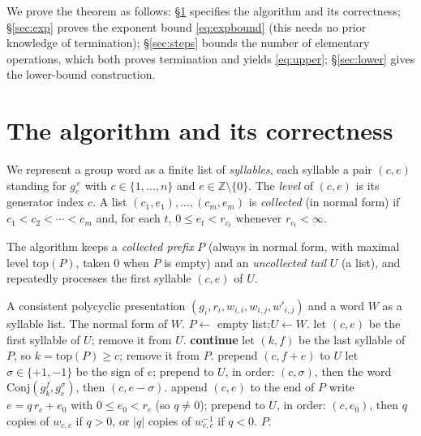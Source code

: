 \documentclass{amsart}
\theoremstyle{definition}
\begin{document}
\medskip
We prove the theorem as follows: \S\ref{sec:alg} specifies the algorithm and its correctness;
\S\ref{sec:exp} proves the exponent bound \eqref{eq:expbound} (this needs no prior knowledge
of termination); \S\ref{sec:steps} bounds the number of elementary operations, which both
proves termination and yields \eqref{eq:upper}; \S\ref{sec:lower} gives the lower-bound
construction.

\section{The algorithm and its correctness}\label{sec:alg}

We represent a group word as a finite list of \emph{syllables}, each syllable a pair $(c,e)$
standing for $g_c^{\,e}$ with $c\in\{1,\dots,n\}$ and $e\in\mathbb Z\setminus\{0\}$. The
\emph{level} of $(c,e)$ is its generator index $c$. A list $(c_1,e_1),\dots,(c_m,e_m)$ is
\emph{collected} (in normal form) if $c_1<c_2<\cdots<c_m$ and, for each $t$, $0\le
e_t<r_{c_t}$ whenever $r_{c_t}<\infty$.

The algorithm keeps a \emph{collected prefix} $P$ (always in normal form, with maximal level
$\mathrm{top}(P)$, taken $0$ when $P$ is empty) and an \emph{uncollected tail} $U$ (a list),
and repeatedly processes the first syllable $(c,e)$ of $U$.

\begin{algorithm}[h]
\caption{Collection from the left}\label{alg:collect}
\begin{algorithmic}[1]
\Require A consistent polycyclic presentation $(g_i,r_i,w_{i,i},w_{i,j},w'_{i,j})$ and a
word $W$ as a syllable list.
\Ensure The normal form of $W$.
\State $P\gets$ empty list;\quad $U\gets W$.
  \State let $(c,e)$ be the first syllable of $U$; remove it from $U$.
   \State \textbf{continue} \EndIf
  \label{ln:swap}
     \State let $(k,f)$ be the last syllable of $P$, so $k=\mathrm{top}(P)\ge c$; remove it
     from $P$.
      \State prepend $(c,f+e)$ to $U$ 
     \Else {}
        \State let $\sigma\in\{+1,-1\}$ be the sign of $e$;
        \State prepend to $U$, in order: $(c,\sigma)$, then the word $\mathrm{Conj}(g_k^{f},g_c^{\sigma})$,
        then $(c,e-\sigma)$.\label{ln:swapprepend}
     \EndIf
  \label{ln:place}
     \State append $(c,e)$ to the end of $P$ 
  \Else {}\label{ln:power}
     \State write $e=q\,r_c+e_0$ with $0\le e_0<r_c$ (so $q\ne0$);
     \State prepend to $U$, in order: $(c,e_0)$, then $q$ copies of $w_{c,c}$ if $q>0$, or
     $|q|$ copies of $w_{c,c}^{-1}$ if $q<0$.\label{ln:powerprepend}
  \EndIf
\EndWhile
\State \Return $P$.
\end{algorithmic}
\end{algorithm}
\end{document}
